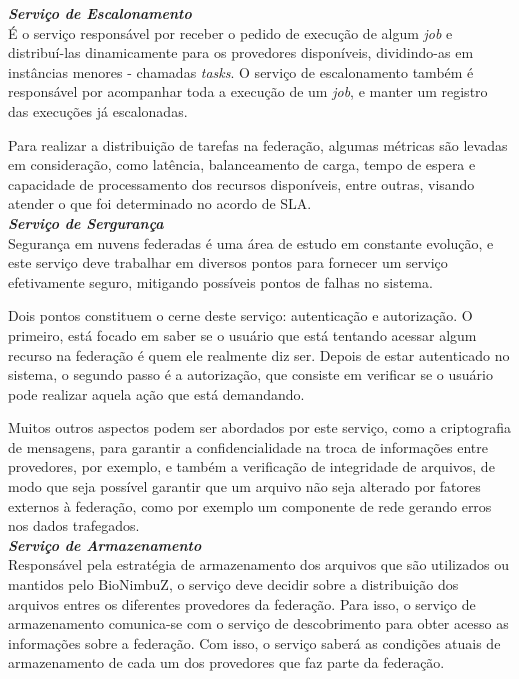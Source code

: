 \noindent
\textbf{\textit{Serviço de Escalonamento}} \\

\noindent
É o serviço responsável por receber o pedido de execução de algum \textit{job} e distribuí-las dinamicamente para os provedores disponíveis, dividindo-as em instâncias menores - chamadas \textit{tasks}. O serviço de escalonamento também é responsável por acompanhar toda a execução de um \textit{job}, e manter um registro das execuções já escalonadas. 

Para realizar a distribuição de tarefas na federação, algumas métricas são levadas em consideração, como latência, balanceamento de carga, tempo de espera e capacidade de processamento dos recursos disponíveis, entre outras, visando atender o que foi determinado no acordo de SLA. \\

\noindent
\textbf{\textit{Serviço de Sergurança}} \\

\noindent
Segurança em nuvens federadas é uma área de estudo em constante evolução, e este serviço deve trabalhar em diversos pontos para fornecer um serviço efetivamente seguro, mitigando possíveis pontos de falhas no sistema. 

Dois pontos constituem o cerne deste serviço: autenticação e autorização. O primeiro, está focado em saber se o usuário que está tentando acessar algum recurso na federação é quem ele realmente diz ser. Depois de estar autenticado no sistema, o segundo passo é a autorização, que consiste em verificar se o usuário pode realizar aquela ação que está demandando. 

Muitos outros aspectos podem ser abordados por este serviço, como a criptografia de mensagens, para garantir a confidencialidade na troca de informações entre provedores, por exemplo, e também a verificação de integridade de arquivos, de modo que seja possível garantir que um arquivo não seja alterado por fatores externos à federação, como por exemplo um componente de rede gerando erros nos dados trafegados. \\

\noindent
\textbf{\textit{Serviço de Armazenamento}} \\

\noindent
Responsável pela estratégia de armazenamento dos arquivos que são utilizados ou mantidos pelo BioNimbuZ, o serviço deve decidir sobre a distribuição dos arquivos entres os diferentes provedores da federação. Para isso, o serviço de armazenamento comunica-se com o serviço de descobrimento para obter acesso as informações sobre a federação. Com isso, o serviço saberá as condições atuais de armazenamento de cada um dos provedores que faz parte da federação.

